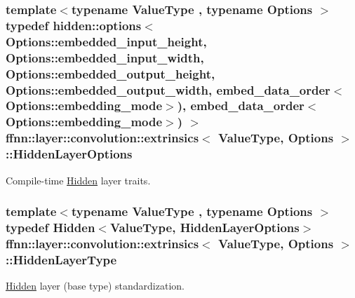 \hypertarget{structffnn_1_1layer_1_1convolution_1_1extrinsics_a301768029fa1eb16a28981139c8122ce}{
\subsubsection[{Hidden\-Layer\-Options}]{\setlength{\rightskip}{0pt plus 5cm}template$<$typename Value\-Type , typename Options $>$ typedef {\bf hidden\-::options}$<$ Options\-::embedded\-\_\-input\-\_\-height, Options\-::embedded\-\_\-input\-\_\-width, Options\-::embedded\-\_\-output\-\_\-height, Options\-::embedded\-\_\-output\-\_\-width, {\bf embed\-\_\-data\-\_\-order}$<$Options\-::embedding\-\_\-mode$>$), {\bf embed\-\_\-data\-\_\-order}$<$Options\-::embedding\-\_\-mode$>$) $>$ {\bf ffnn\-::layer\-::convolution\-::extrinsics}$<$ Value\-Type, Options $>$\-::{\bf Hidden\-Layer\-Options}}}\label{structffnn_1_1layer_1_1convolution_1_1extrinsics_a301768029fa1eb16a28981139c8122ce}


Compile-\/time \hyperlink{classffnn_1_1layer_1_1_hidden}{Hidden} layer traits. 

\hypertarget{structffnn_1_1layer_1_1convolution_1_1extrinsics_a92f9ad843e8bb328d35604bdb4d6c87f}{
\subsubsection[{Hidden\-Layer\-Type}]{\setlength{\rightskip}{0pt plus 5cm}template$<$typename Value\-Type , typename Options $>$ typedef {\bf Hidden}$<$Value\-Type, {\bf Hidden\-Layer\-Options}$>$ {\bf ffnn\-::layer\-::convolution\-::extrinsics}$<$ Value\-Type, Options $>$\-::{\bf Hidden\-Layer\-Type}}}\label{structffnn_1_1layer_1_1convolution_1_1extrinsics_a92f9ad843e8bb328d35604bdb4d6c87f}


\hyperlink{classffnn_1_1layer_1_1_hidden}{Hidden} layer (base type) standardization. 

